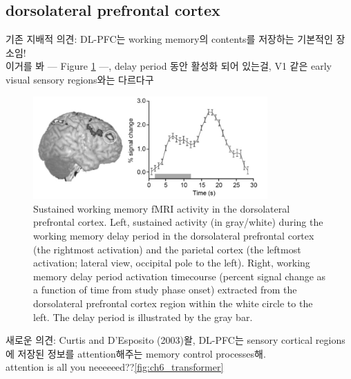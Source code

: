 \documentclass[../note.tex]{subfiles}
\begin{document}
\subsection{dorsolateral prefrontal cortex}
기존 지배적 의견: DL-PFC는 working memory의 contents를 저장하는 기본적인 장소임!\\
이거를 봐 --- Figure \ref{fig:ch6_activity} ---, delay period 동안 활성화 되어 있는걸, V1 같은 early visual sensory
regions와는 다르다구\\

\begin{figure}[htbp]
  \centering
  \includegraphics[width=0.8\textwidth]{image/ch6_activity}
  \caption{Sustained working memory fMRI activity in the dorsolateral prefrontal cortex.
Left, sustained activity (in gray/white) during the working memory delay period in the
dorsolateral prefrontal cortex (the rightmost activation) and the parietal cortex (the leftmost
activation; lateral view, occipital pole to the left). Right, working memory delay period
activation timecourse (percent signal change as a function of time from study phase onset)
extracted from the dorsolateral prefrontal cortex region within the white circle to the left.
The delay period is illustrated by the gray bar.}
  \label{fig:ch6_activity}
\end{figure}

새로운 의견: Curtis and D’Esposito (2003)왈, DL-PFC는 sensory cortical
regions에 저장된 정보를 attention해주는 memory control processes해.\\

attention is all you neeeeeed??\ref{fig:ch6_transformer}\\
\end{document}
